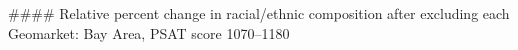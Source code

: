 #### Relative percent change in racial/ethnic composition after excluding each Geomarket: Bay Area, PSAT score 1070–1180
